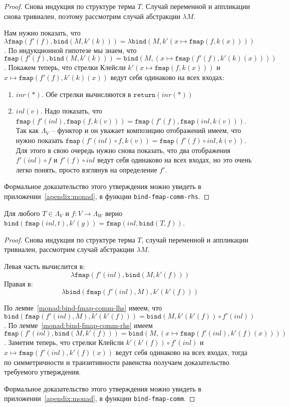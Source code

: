 \begin{proof}
  Снова индукция по структуре терма $T$. Случай переменной и аппликации снова тривиален, поэтому рассмотрим случай абстракции $\lambda M$.

  Нам нужно показать, что $\lambda \texttt{fmap}(f'(f), \texttt{bind}(M, k'(k))) = \lambda \texttt{bind}(M, k'(x \mapsto \texttt{fmap}(f, k(x))))$. По индукционной гипотезе мы знаем, что $\texttt{fmap}(f'(f), \texttt{bind}(M, k'(k))) = \texttt{bind}(M, (x \mapsto \texttt{fmap}(f'(f), k'(k)(x))))$. Покажем теперь, что стрелки Клейсли $ k'(x \mapsto \texttt{fmap}(f, k(x))) $ и $ x \mapsto \texttt{fmap}(f'(f), k'(k)(x)) $ ведут себя одинаково на всех входах:

  \begin{enumerate}
    \item $inr(*)$. Обе стрелки вычисляются в $\texttt{return}(inr(*))$
    \item $inl(v)$. Надо показать, что $\texttt{fmap}(f'(inl), \texttt{fmap}(f, k(v))) = \texttt{fmap}(f'(f), \texttt{fmap}(inl, k(v)))$. Так как $\Lambda_{V}$ -- функтор и он уважает композицию отображений имеем, что нужно показать $\texttt{fmap}(f'(inl) \circ f, k(v)) = \texttt{fmap}(f'(f) \circ inl, k(v))$. Для этого в свою очередь нужно снова показать, что два отображения $f'(inl) \circ f$ и $f'(f) \circ inl$ ведут себя одинаково на всех входах, но это очень легко понять, просто взглянув на определение $f'$.
  \end{enumerate}

  Формальное доказательство этого утверждения можно увидеть в приложении~\ref{apendix:monad}, в функции \texttt{bind-fmap-comm-rhs}.
\end{proof}

\begin{lemma}
  \label{monad:bind-fmap-comm}
  Для любого $T \in \Lambda_{V}$ и $f : V \to \Lambda_{W}$ верно $\texttt{bind}(\texttt{fmap}(inl, t), k'(g)) = \texttt{fmap}(inl, \texttt{bind}(T, f))$.
\end{lemma}

\begin{proof}
  Снова индукция по структуре терма $T$, случай переменной и аппликации тривиален, рассмотрим случай абстракции $\lambda M$.

  Левая часть вычислится в:
  $$ \lambda \texttt{fmap}(f'(inl), \texttt{bind}(M, k'(f))) $$
  Правая в:
  $$ \lambda \texttt{bind}(\texttt{fmap}(f'(inl), M), k'(k'(f))) $$

  По лемме~\ref{monad:bind-fmap-comm-lhs} имеем, что $\texttt{bind}(\texttt{fmap}(f'(inl), M), k'(k'(f))) = \texttt{bind}(M, k'(k'(f)) \circ f'(inl))$. По лемме~\ref{monad:bind-fmap-comm-rhs} имеем $\texttt{fmap}(f'(inl), \texttt{bind}(M, k'(f))) = \texttt{bind}(M, (x \mapsto \texttt{fmap}(f'(inl), k'(f)(x))))$. Заметим теперь, что стрелки Клейсли $k'(k'(f)) \circ f'(inl)$ и $x \mapsto \texttt{fmap}(f'(inl), k'(f)(x))$ ведут себя одинаково на всех входах, тогда по симметричности и транзитивности равенства получаем доказательство требуемого утверждения.

  Формальное доказательство этого утверждения можно увидеть в приложении~\ref{apendix:monad}, в функции \texttt{bind-fmap-comm}.
\end{proof}

